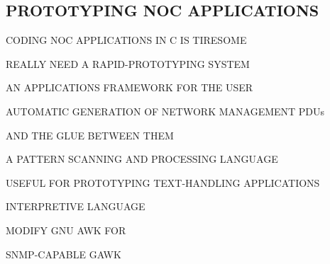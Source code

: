\begin{bwslide}
\part	{PROTOTYPING NOC APPLICATIONS}\bf

\begin{nrtc}
\item	CODING NOC APPLICATIONS IN C IS TIRESOME

\item	REALLY NEED A RAPID-PROTOTYPING SYSTEM
\end{nrtc}
\end{bwslide}


\begin{bwslide}

\begin{nrtc}
\item	AN APPLICATIONS FRAMEWORK FOR THE USER

\item	AUTOMATIC GENERATION OF NETWORK MANAGEMENT PDUs
    \begin{nrtc}
    \item	AND THE GLUE BETWEEN THEM    
    \end{nrtc}
\end{nrtc}
\end{bwslide}


\begin{bwslide}

\begin{nrtc}
\item	A PATTERN SCANNING AND PROCESSING LANGUAGE

\item	USEFUL FOR PROTOTYPING TEXT-HANDLING APPLICATIONS

\item	INTERPRETIVE LANGUAGE

\item	MODIFY GNU AWK FOR
    \begin{nrtc}
    \item	SNMP-CAPABLE GAWK
    \end{nrtc}
\end{nrtc}
\end{bwslide}


